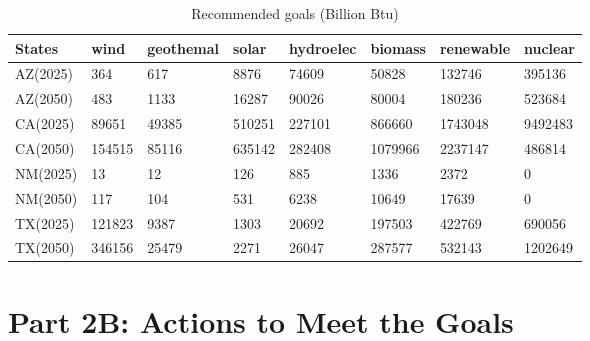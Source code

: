 \documentclass{mcmthesis}
\begin{document}
\begin{table}[!ht]
\caption{Recommended goals (Billion Btu)}
 \renewcommand\arraystretch{1.5}
 \setlength{\abovecaptionskip}{0pt}%
\setlength{\belowcaptionskip}{10pt}%
\begin{center}
\begin{tabular}{p{}<{\centering}p{}<{\centering}
p{}<{\centering}p{}<{\centering}
p{}<{\centering}p{}<{\centering}
p{}<{\centering}p{}<{\centering} }

\toprule[1.5pt]
States & wind & geothemal &	solar &	hydroelec &	biomass &	renewable & nuclear \\
 \midrule

AZ(2025) & 364 & 617 & 8876 & 74609 & 50828 & 132746 & 395136 \\
AZ(2050) & 483 &	1133 &	16287 &	90026 &	80004 &	180236 &	523684 \\

CA(2025) & 89651 &	49385 &	510251 & 227101 &	866660 & 1743048 &	9492483\\
CA(2050) & 154515 & 85116 & 635142 & 282408 & 1079966 & 2237147 & 486814 \\

NM(2025) & 13	& 12 & 126 & 885 & 1336 & 2372 & 0 \\
NM(2050) &117 & 104 & 531 & 6238 & 10649 & 17639 & 0 \\

TX(2025) & 121823 &	9387 &	1303 &	20692 &	197503 &	422769 &	690056 \\
TX(2050) & 346156 &	25479 &	2271 &	26047 &	287577 &	532143 &	1202649 \\

 \bottomrule[1.5pt]
 \end{tabular}
 \end{center} 
 \end{table}

\section{Part 2B: Actions to Meet the Goals}
\end{document}
